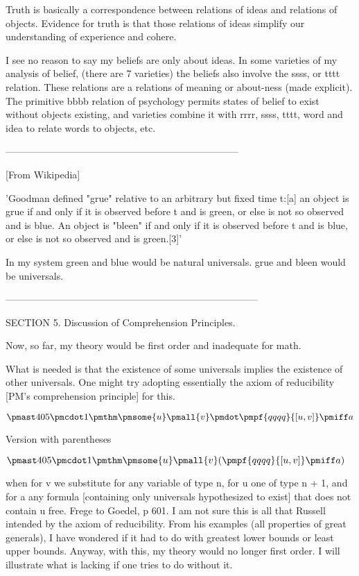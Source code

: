 \documentclass[12pt]{article}
\begin{document}
Truth is basically a correspondence between relations of ideas and relations of objects. Evidence for truth is that those relations of ideas simplify our understanding of experience and cohere.

I see no reason to say my beliefs are only about ideas. In some varieties of my analysis of belief, (there are 7 varieties) the beliefs also involve the ssss, or tttt relation. These relations are a relations of meaning or about-ness (made explicit). The primitive bbbb relation of psychology permits states of belief to exist without objects existing, and varieties combine it with rrrr, ssss, tttt, word and idea to relate words to objects, etc.

------------------------------------------------------------------------

[From Wikipedia]

'Goodman defined "grue" relative to an arbitrary but fixed time t:[a] an object is grue if and only if it is observed before t and is green, or else is not so observed and is blue. An object is "bleen" if and only if it is observed before t and is blue, or else is not so observed and is green.[3]'

In my system green and blue would be natural universals. grue and bleen would be universals.

------------------------------------------------------------------------------

SECTION 5. Discussion of Comprehension Principles.

Now, so far, my theory would be first order and inadequate for math.

What is needed is that the existence of some universals implies the existence of other universals. One might try adopting essentially the axiom of reducibility [PM's comprehension principle] for this.

$\pmast 405 \pmcdot 1 \pmthm \pmsome{u} \pmall{v} \pmdot \pmpf{qqqq}{[u,v]} \pmiff a$
 
 

Version with parentheses

$\pmast 405 \pmcdot 1 \pmthm \pmsome{u} \pmall{v}  (  \pmpf{qqqq}{[u,v]} \pmiff a)$


when for v we substitute for any variable of type n, for u one of type n + 1, and for a any formula [containing only universals hypothesized to exist] that does not contain u free. Frege to Goedel, p 601. I am not sure this is all that Russell intended by the axiom of reducibility. From his examples (all properties of great generals), I have wondered if it had to do with  greatest lower bounds or least upper bounds. Anyway, with this, my theory would no longer first order. I will illustrate what is lacking if one tries to do without it.
\end{document}

